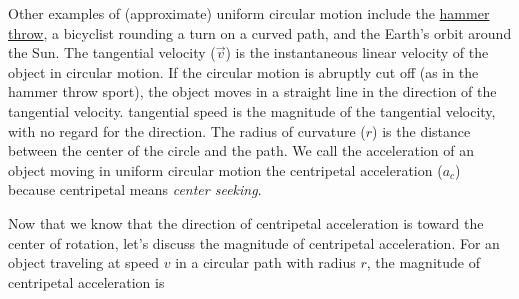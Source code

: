 \documentclass[main-physics.tex]{subfiles}
\begin{document}
\begin{center}
\captionsetup{type=figure,margin=1in,font=scriptsize}
\label{4QmpMJ}
\end{center}

Other examples of (approximate) uniform circular motion include the \href{https://youtu.be/3NYlYN-QTig}{hammer throw}, a bicyclist rounding a turn on a curved path, and the Earth's orbit around the Sun. The \gls{tangential velocity} ($\vec{v}$) is the instantaneous linear velocity of the object in circular motion. If the circular motion is abruptly cut off (as in the hammer throw sport), the object moves in a straight line in the direction of the tangential velocity. \Gls{tangential speed} is the magnitude of the tangential velocity, with no regard for the direction. The \gls{radius of curvature} ($r$) is the distance between the center of the circle and the path. We call the acceleration of an object moving in uniform circular motion the \gls{centripetal acceleration} ($a_c$) because centripetal means \textit{center seeking}.

\vspace{1em}

Now that we know that the direction of centripetal acceleration is toward the center of rotation, let's discuss the magnitude of centripetal acceleration. For an object traveling at speed $v$ in a circular path with radius $r$, the magnitude of centripetal acceleration is
\end{document}
